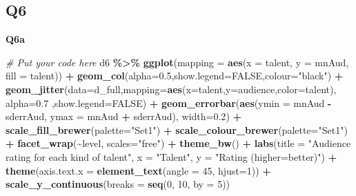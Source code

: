 \documentclass[
]{article}
\newenvironment{Shaded}{\begin{snugshade}}{\end{snugshade}}
\newcommand{\AttributeTok}[1]{\textcolor[rgb]{0.13,0.29,0.53}{#1}}
\newcommand{\CommentTok}[1]{\textcolor[rgb]{0.56,0.35,0.01}{\textit{#1}}}
\newcommand{\ConstantTok}[1]{\textcolor[rgb]{0.56,0.35,0.01}{#1}}
\newcommand{\DecValTok}[1]{\textcolor[rgb]{0.00,0.00,0.81}{#1}}
\newcommand{\FloatTok}[1]{\textcolor[rgb]{0.00,0.00,0.81}{#1}}
\newcommand{\FunctionTok}[1]{\textcolor[rgb]{0.13,0.29,0.53}{\textbf{#1}}}
\newcommand{\NormalTok}[1]{#1}
\newcommand{\SpecialCharTok}[1]{\textcolor[rgb]{0.81,0.36,0.00}{\textbf{#1}}}
\newcommand{\StringTok}[1]{\textcolor[rgb]{0.31,0.60,0.02}{#1}}
\begin{document}
\hypertarget{q6}{%
\subsection{Q6}\label{q6}}

\textbf{Q6a}

\begin{Shaded}
\begin{Highlighting}[]
\CommentTok{\# Put your code here}
\NormalTok{d6 }\SpecialCharTok{\%\textgreater{}\%}
  \FunctionTok{ggplot}\NormalTok{(}\AttributeTok{mapping =} \FunctionTok{aes}\NormalTok{(}\AttributeTok{x =}\NormalTok{ talent, }\AttributeTok{y =}\NormalTok{ mnAud, }\AttributeTok{fill =}\NormalTok{ talent)) }\SpecialCharTok{+}
  \FunctionTok{geom\_col}\NormalTok{(}\AttributeTok{alpha=}\FloatTok{0.5}\NormalTok{,}\AttributeTok{show.legend=}\ConstantTok{FALSE}\NormalTok{,}\AttributeTok{colour=}\StringTok{"black"}\NormalTok{) }\SpecialCharTok{+} 
  \FunctionTok{geom\_jitter}\NormalTok{(}\AttributeTok{data=}\NormalTok{d\_full,}\AttributeTok{mapping=}\FunctionTok{aes}\NormalTok{(}\AttributeTok{x=}\NormalTok{talent,}\AttributeTok{y=}\NormalTok{audience,}\AttributeTok{color=}\NormalTok{talent),}
              \AttributeTok{alpha=}\FloatTok{0.7}\NormalTok{ ,}\AttributeTok{show.legend=}\ConstantTok{FALSE}\NormalTok{) }\SpecialCharTok{+}
  \FunctionTok{geom\_errorbar}\NormalTok{(}\FunctionTok{aes}\NormalTok{(}\AttributeTok{ymin =}\NormalTok{ mnAud }\SpecialCharTok{{-}}\NormalTok{ sderrAud, }
                    \AttributeTok{ymax =}\NormalTok{ mnAud }\SpecialCharTok{+}\NormalTok{ sderrAud), }\AttributeTok{width=}\FloatTok{0.2}\NormalTok{) }\SpecialCharTok{+}
  \FunctionTok{scale\_fill\_brewer}\NormalTok{(}\AttributeTok{palette=}\StringTok{"Set1"}\NormalTok{) }\SpecialCharTok{+}
  \FunctionTok{scale\_colour\_brewer}\NormalTok{(}\AttributeTok{palette=}\StringTok{"Set1"}\NormalTok{) }\SpecialCharTok{+}
  \FunctionTok{facet\_wrap}\NormalTok{(}\SpecialCharTok{\textasciitilde{}}\NormalTok{level, }\AttributeTok{scales=}\StringTok{"free"}\NormalTok{) }\SpecialCharTok{+}
  \FunctionTok{theme\_bw}\NormalTok{() }\SpecialCharTok{+}
  \FunctionTok{labs}\NormalTok{(}\AttributeTok{title =} \StringTok{"Audience rating for each kind of talent"}\NormalTok{,}
       \AttributeTok{x =} \StringTok{"Talent"}\NormalTok{,}
       \AttributeTok{y =} \StringTok{"Rating (higher=better)"}\NormalTok{) }\SpecialCharTok{+}
  \FunctionTok{theme}\NormalTok{(}\AttributeTok{axis.text.x =} \FunctionTok{element\_text}\NormalTok{(}\AttributeTok{angle =} \DecValTok{45}\NormalTok{, }\AttributeTok{hjust=}\DecValTok{1}\NormalTok{)) }\SpecialCharTok{+}
  \FunctionTok{scale\_y\_continuous}\NormalTok{(}\AttributeTok{breaks =} \FunctionTok{seq}\NormalTok{(}\DecValTok{0}\NormalTok{, }\DecValTok{10}\NormalTok{, }\AttributeTok{by =} \DecValTok{5}\NormalTok{))}
\end{Highlighting}
\end{Shaded}
\end{document}
